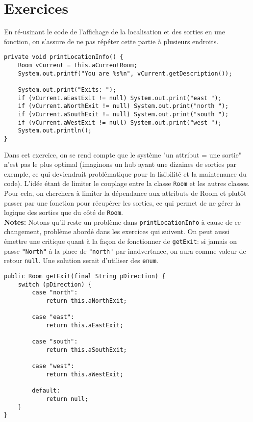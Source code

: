 \chapter{Exercices}

\setcounter{section}{7}
\setcounter{exercise}{4}

\begin{exercise}[subtitle=printLocationInfo]

En ré-usinant le code de l'affichage de la localisation et des sorties en une fonction, on s'assure de ne pas répéter cette partie à plusieurs endroits.

\begin{verbatim}
private void printLocationInfo() {
    Room vCurrent = this.aCurrentRoom;
    System.out.printf("You are %s%n", vCurrent.getDescription());
   
    System.out.print("Exits: ");
    if (vCurrent.aEastExit != null) System.out.print("east ");
    if (vCurrent.aNorthExit != null) System.out.print("north ");
    if (vCurrent.aSouthExit != null) System.out.print("south ");
    if (vCurrent.aWestExit != null) System.out.print("west ");
    System.out.println();
}
\end{verbatim}
\end{exercise}

\begin{exercise}[subtitle=getExit]

Dans cet exercice, on se rend compte que le système "un attribut = une sortie" n'est pas le plus optimal (imaginons un hub ayant une dizaines de sorties par exemple, ce qui deviendrait problématique pour la lisibilité et la maintenance du code). L'idée étant de limiter le couplage entre la classe \verb|Room| et les autres classes. Pour cela, on cherchera à limiter la dépendance aux attributs de Room et plutôt passer par une fonction pour récupérer les sorties, ce qui permet de ne gérer la logique des sorties que du côté de \verb|Room|.\\ 

\textbf{Notes:} Notons qu'il reste un problème dans \verb|printLocationInfo| à cause de ce changement, problème abordé dans les exercices qui suivent. On peut aussi émettre une critique quant à la façon de fonctionner de \verb|getExit|: si jamais on passe \verb|"North"| à la place de \verb|"north"| par inadvertance, on aura comme valeur de retour \verb|null|. Une solution serait d'utiliser des \verb|enum|.

\begin{verbatim}
public Room getExit(final String pDirection) {
    switch (pDirection) {
        case "north":
            return this.aNorthExit;

        case "east":
            return this.aEastExit;

        case "south":
            return this.aSouthExit;

        case "west":
            return this.aWestExit;

        default:
            return null;
    }
}
\end{verbatim}
\end{exercise}

